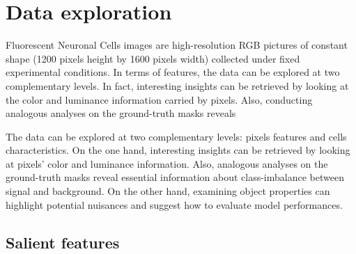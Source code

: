 \section{Data exploration}
\label{sec:data_exploration}

Fluorescent Neuronal Cells images are high-resolution RGB pictures of constant shape (1200 pixels height by 1600 pixels width) collected under fixed experimental conditions.
In terms of features, the data can be explored at two complementary levels. 
In fact, interesting insights can be retrieved by looking at the color and luminance information carried by pixels. Also, conducting analogous analyses on the ground-truth masks reveals

The data can be explored at two complementary levels: pixels features and cells characteristics. 
On the one hand, interesting insights can be retrieved by looking at pixels' color and luminance information. Also, analogous analyses on the ground-truth masks reveal essential information about class-imbalance between signal and background.
On the other hand, examining object properties can highlight potential nuisances and suggest how to evaluate model performances.

\subsection{Salient features}
\label{sec:data_features}

